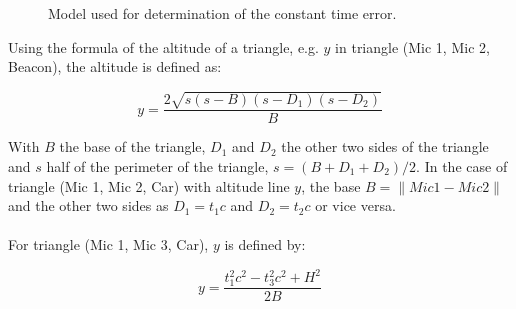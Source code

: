 \documentclass[final]{scrreprt} %
\begin{document}
\begin{figure} [H]
\centering
	\caption{Model used for determination of the constant time error.}
	\label{fig:constant}
\end{figure}

Using the formula of the altitude of a triangle, e.g. $y$ in triangle (Mic 1, Mic 2, Beacon), the altitude is defined as:

\begin{equation}
	y = \frac{2 \sqrt{s(s - B)(s - D_1)(s - D_2)}}{B}
\label{eq:y1}
\end{equation}

With $B$ the base of the triangle, $D_1$ and $D_2$ the other two sides of the triangle and $s$ half of the perimeter of the triangle, $s = (B + D_1 + D_2) / 2$.
In the case of triangle (Mic 1, Mic 2, Car) with altitude line $y$, the base $B = \lVert Mic 1 - Mic 2 \rVert$ and the other two sides as $D_1 = t_1 c$ and $D_2 = t_2 c$ or vice versa.
\\ \\
For triangle (Mic 1, Mic 3, Car), $y$ is defined by:

\begin{equation}
	y = \frac{t_1^2 c^2 - t_3^2 c^2 + H^2}{2 B}
\label{eq:y2}
\end{equation}
\end{document}
